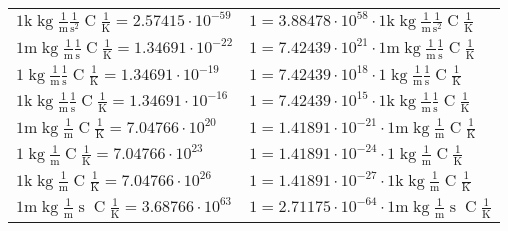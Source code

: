 \begin{center}
\begin{longtable}{l l}
{\color{gray}$1 \bm{\mathrm{ k}}\operatorname{kg}\frac1{\operatorname{m}}\frac1{\operatorname{s}^2}{\operatorname{C}}\frac1{\operatorname{K}} = 2.57415\cdot10^{-59} $}   & {\color{gray}$ 1 = 3.88478\cdot10^{58} \cdot 1 \bm{\mathrm{ k}}\operatorname{kg}\frac1{\operatorname{m}}\frac1{\operatorname{s}^2}{\operatorname{C}}\frac1{\operatorname{K}}$}  \\
{\color{gray}$1 \bm{\mathrm{ m}}\operatorname{kg}\frac1{\operatorname{m}}\frac1{\operatorname{s}}{\operatorname{C}}\frac1{\operatorname{K}} = 1.34691\cdot10^{-22} $}   & {\color{gray}$ 1 = 7.42439\cdot10^{21} \cdot 1 \bm{\mathrm{ m}}\operatorname{kg}\frac1{\operatorname{m}}\frac1{\operatorname{s}}{\operatorname{C}}\frac1{\operatorname{K}}$}  \\
{\color{black}$1 \bm{\mathrm{ }}\operatorname{kg}\frac1{\operatorname{m}}\frac1{\operatorname{s}}{\operatorname{C}}\frac1{\operatorname{K}} = 1.34691\cdot10^{-19} $}   & {\color{black}$ 1 = 7.42439\cdot10^{18} \cdot 1 \bm{\mathrm{ }}\operatorname{kg}\frac1{\operatorname{m}}\frac1{\operatorname{s}}{\operatorname{C}}\frac1{\operatorname{K}}$}  \\
{\color{gray}$1 \bm{\mathrm{ k}}\operatorname{kg}\frac1{\operatorname{m}}\frac1{\operatorname{s}}{\operatorname{C}}\frac1{\operatorname{K}} = 1.34691\cdot10^{-16} $}   & {\color{gray}$ 1 = 7.42439\cdot10^{15} \cdot 1 \bm{\mathrm{ k}}\operatorname{kg}\frac1{\operatorname{m}}\frac1{\operatorname{s}}{\operatorname{C}}\frac1{\operatorname{K}}$}  \\
{\color{gray}$1 \bm{\mathrm{ m}}\operatorname{kg}\frac1{\operatorname{m}}{}{\operatorname{C}}\frac1{\operatorname{K}} = 7.04766\cdot10^{20} $}   & {\color{gray}$ 1 = 1.41891\cdot10^{-21} \cdot 1 \bm{\mathrm{ m}}\operatorname{kg}\frac1{\operatorname{m}}{}{\operatorname{C}}\frac1{\operatorname{K}}$}  \\
{\color{black}$1 \bm{\mathrm{ }}\operatorname{kg}\frac1{\operatorname{m}}{}{\operatorname{C}}\frac1{\operatorname{K}} = 7.04766\cdot10^{23} $}   & {\color{black}$ 1 = 1.41891\cdot10^{-24} \cdot 1 \bm{\mathrm{ }}\operatorname{kg}\frac1{\operatorname{m}}{}{\operatorname{C}}\frac1{\operatorname{K}}$}  \\
{\color{gray}$1 \bm{\mathrm{ k}}\operatorname{kg}\frac1{\operatorname{m}}{}{\operatorname{C}}\frac1{\operatorname{K}} = 7.04766\cdot10^{26} $}   & {\color{gray}$ 1 = 1.41891\cdot10^{-27} \cdot 1 \bm{\mathrm{ k}}\operatorname{kg}\frac1{\operatorname{m}}{}{\operatorname{C}}\frac1{\operatorname{K}}$}  \\
{\color{gray}$1 \bm{\mathrm{ m}}\operatorname{kg}\frac1{\operatorname{m}}{\operatorname{s}}{\operatorname{C}}\frac1{\operatorname{K}} = 3.68766\cdot10^{63} $}   & {\color{gray}$ 1 = 2.71175\cdot10^{-64} \cdot 1 \bm{\mathrm{ m}}\operatorname{kg}\frac1{\operatorname{m}}{\operatorname{s}}{\operatorname{C}}\frac1{\operatorname{K}}$}  \\

\end{longtable}
\end{center}
